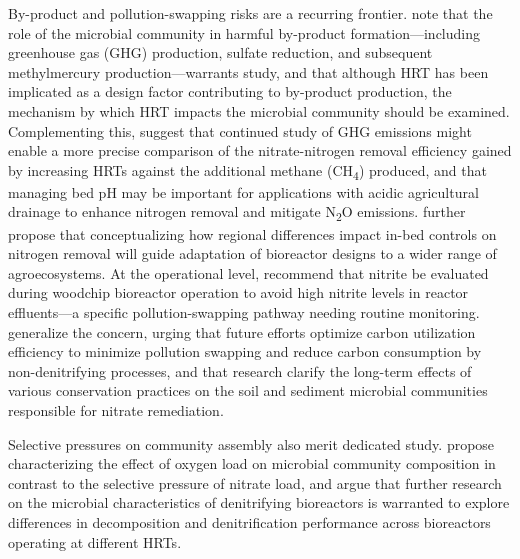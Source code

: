 \documentclass[11pt]{article}
\begin{document}
By-product and pollution-swapping risks are a recurring frontier. \textcite{Hartfiel2022} note that the role of the microbial community in harmful by-product formation---including greenhouse gas (GHG) production, sulfate reduction, and subsequent methylmercury production---warrants study, and that although HRT has been implicated as a design factor contributing to by-product production, the mechanism by which HRT impacts the microbial community should be examined. Complementing this, \textcite{Bock2018} suggest that continued study of GHG emissions might enable a more precise comparison of the nitrate-nitrogen removal efficiency gained by increasing HRTs against the additional methane (CH\textsubscript{4}) produced, and that managing bed pH may be important for applications with acidic agricultural drainage to enhance nitrogen removal and mitigate N\textsubscript{2}O emissions. \textcite{Bock2018} further propose that conceptualizing how regional differences impact in-bed controls on nitrogen removal will guide adaptation of bioreactor designs to a wider range of agroecosystems. At the operational level, \textcite{Kouanda2021} recommend that nitrite be evaluated during woodchip bioreactor operation to avoid high nitrite levels in reactor effluents---a specific pollution-swapping pathway needing routine monitoring. \textcite{Wang2025b} generalize the concern, urging that future efforts optimize carbon utilization efficiency to minimize pollution swapping and reduce carbon consumption by non-denitrifying processes, and that research clarify the long-term effects of various conservation practices on the soil and sediment microbial communities responsible for nitrate remediation.

Selective pressures on community assembly also merit dedicated study. \textcite{Schaefer2021} propose characterizing the effect of oxygen load on microbial community composition in contrast to the selective pressure of nitrate load, and argue that further research on the microbial characteristics of denitrifying bioreactors is warranted to explore differences in decomposition and denitrification performance across bioreactors operating at different HRTs.
\end{document}
